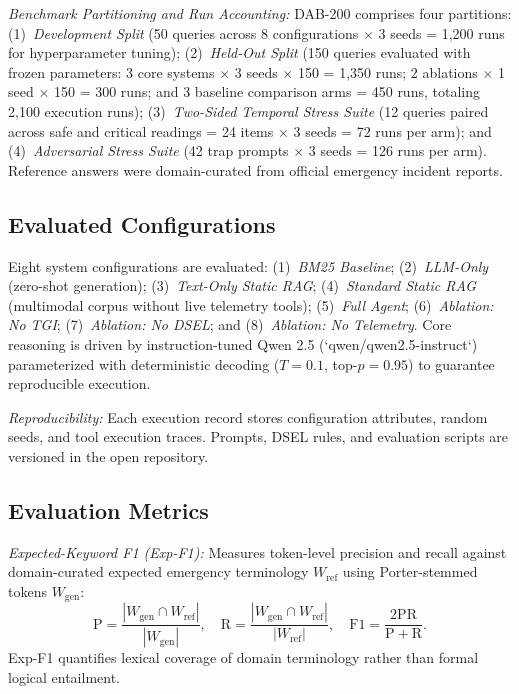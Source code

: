 \documentclass[conference]{IEEEtran}
\begin{document}
\textit{Benchmark Partitioning and Run Accounting:} DAB-200 comprises four partitions: (1)~\textit{Development Split} (50 queries across 8 configurations $\times$ 3 seeds = 1,200 runs for hyperparameter tuning); (2)~\textit{Held-Out Split} (150 queries evaluated with frozen parameters: 3 core systems $\times$ 3 seeds $\times$ 150 = 1,350 runs; 2 ablations $\times$ 1 seed $\times$ 150 = 300 runs; and 3 baseline comparison arms = 450 runs, totaling 2,100 execution runs); (3)~\textit{Two-Sided Temporal Stress Suite} (12 queries paired across safe and critical readings = 24 items $\times$ 3 seeds = 72 runs per arm); and (4)~\textit{Adversarial Stress Suite} (42 trap prompts $\times$ 3 seeds = 126 runs per arm). Reference answers were domain-curated from official emergency incident reports.

\subsection{Evaluated Configurations}
Eight system configurations are evaluated: (1)~\textit{BM25 Baseline}; (2)~\textit{LLM-Only} (zero-shot generation); (3)~\textit{Text-Only Static RAG}; (4)~\textit{Standard Static RAG} (multimodal corpus without live telemetry tools); (5)~\textit{Full Agent}; (6)~\textit{Ablation: No TGI}; (7)~\textit{Ablation: No DSEL}; and (8)~\textit{Ablation: No Telemetry}. Core reasoning is driven by instruction-tuned Qwen 2.5 (`qwen/qwen2.5-instruct`) parameterized with deterministic decoding ($T=0.1$, top-$p=0.95$) to guarantee reproducible execution.

\textit{Reproducibility:} Each execution record stores configuration attributes, random seeds, and tool execution traces. Prompts, DSEL rules, and evaluation scripts are versioned in the open repository.

\subsection{Evaluation Metrics}
\textit{Expected-Keyword F1 (Exp-F1):} Measures token-level precision and recall against domain-curated expected emergency terminology $W_{\mathrm{ref}}$ using Porter-stemmed tokens $W_{\mathrm{gen}}$:
\begin{equation}
\mathrm{P} = \frac{|W_{\mathrm{gen}} \cap W_{\mathrm{ref}}|}{|W_{\mathrm{gen}}|}, \quad
\mathrm{R} = \frac{|W_{\mathrm{gen}} \cap W_{\mathrm{ref}}|}{|W_{\mathrm{ref}}|}, \quad
\mathrm{F1} = \frac{2\mathrm{PR}}{\mathrm{P} + \mathrm{R}}.
\label{eq:f1}
\end{equation}
Exp-F1 quantifies lexical coverage of domain terminology rather than formal logical entailment.
\end{document}
